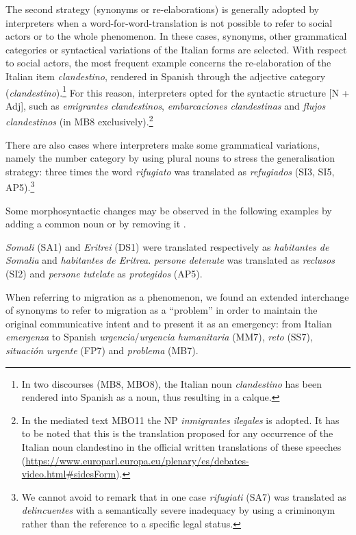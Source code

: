 \documentclass[output=paper]{langscibook}
\begin{document}
The second strategy (synonyms or re-elaborations) is generally adopted by interpreters when a word-for-word-translation is not possible to refer to social actors or to the whole phenomenon. In these cases, synonyms, other grammatical categories or syntactical variations of the Italian forms are selected. With respect to social actors, the most frequent example concerns the re-elaboration of the Italian item \textit{clandestino}, rendered in Spanish through the adjective category (\textit{clandestino}).\footnote{In two discourses (MB8, MBO8), the Italian noun \textit{clandestino} has been rendered into Spanish as a noun, thus resulting in a calque.} For this reason, interpreters opted for the syntactic structure [N + Adj], such as \textit{emigrantes clandestinos}, \textit{embarcaciones clandestinas} and \textit{flujos clandestinos} (in MB8 exclusively).\footnote{In the mediated text MBO11 the NP \textit{inmigrantes ilegales} is adopted. It has to be noted that this is the translation proposed for any occurrence of the Italian noun clandestino in the official written translations of these speeches (\url{https://www.europarl.europa.eu/plenary/es/debates-video.html\#sidesForm}).}

There are also cases where interpreters make some grammatical variations, namely the number category by using plural nouns to stress the generalisation strategy: three times the word \textit{rifugiato} was translated as \textit{refugiados} (SI3, SI5, AP5).\footnote{We cannot avoid to remark that in one case \textit{rifugiati} (SA7) was translated as \textit{delincuentes} with a semantically severe inadequacy by using a criminonym rather than the reference to a specific legal status.} 

Some morphosyntactic changes may be observed in the following examples by adding a common noun  or by removing it .

\ea\label{ex:mori:1}
\textit{Somali} (SA1) and \textit{Eritrei} (DS1) were translated respectively as \textit{habitantes de Somalia} and \textit{habitantes de Eritrea}. 
\z
\ea\label{ex:mori:2}
\textit{persone detenute} was translated as \textit{reclusos} (SI2) and \textit{persone tutelate} as \textit{protegidos} (AP5).
\z

When referring to migration as a phenomenon, we found an extended interchange of synonyms to refer to migration as a “problem” in order to maintain the original communicative intent and to present it as an emergency: from Italian \textit{emergenza} to Spanish \textit{urgencia}/\textit{urgencia humanitaria} (MM7), \textit{reto} (SS7), \textit{situación urgente} (FP7) and \textit{problema} (MB7).
\end{document}
